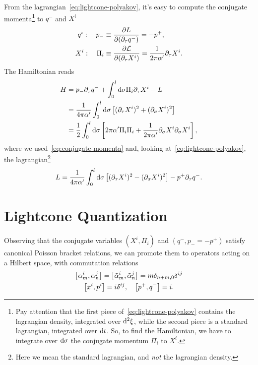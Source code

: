 From the lagrangian~\eqref{eq:lightcone-polyakov}, it's easy to compute the conjugate momenta\footnote{Pay attention that the first piece of~\eqref{eq:lightcone-polyakov} contains the lagrangian density, integrated over $\mathop{}\!\mathrm{d}^2 \xi$, while the second piece is a standard lagrangian, integrated over $\mathop{}\!\mathrm{d} t$. So, to find the Hamiltonian, we have to integrate over $\mathop{}\!\mathrm{d} \sigma$ the conjugate momentum $\Pi_i$ to $X^i$.} to $q^-$ and $X^i$
\begin{subequations}\label{eq:conjugate-momenta}
\begin{align}
    q^i: \quad p_- &\equiv \frac{\partial L}{\partial(\partial_\tau q^-)} = - p^+, \\
    X^i: \quad \Pi_i &\equiv \frac{\partial \mathcal{L}}{\partial(\partial_\tau X^i)} = \frac{1}{2\pi\alpha'} \partial_\tau X^i .
\end{align}
\end{subequations}
The Hamiltonian reads
\begin{equation}\label{eq:lightcone-hamiltonian}
\begin{split}
    H &= p_- \partial_\tau q^- + \int_0^l \mathop{}\!\mathrm{d} \sigma \Pi_i \partial_\tau X^i - L \\
    &= \frac{1}{4\pi\alpha'} \int_0^l \mathop{}\!\mathrm{d} \sigma \left[ (\partial_\tau X^i)^2 + (\partial_\sigma X^i)^2 \right] \\ 
    &= \frac{1}{2} \int_0^l \mathop{}\!\mathrm{d} \sigma \left[ 2\pi\alpha' \Pi_i \Pi_i + \frac{1}{2\pi\alpha'} \partial_\sigma X^i \partial_\sigma X^i \right],
\end{split}
\end{equation}
where we used~\eqref{eq:conjugate-momenta} and, looking at~\eqref{eq:lightcone-polyakov}, the lagrangian\footnote{Here we mean the standard lagrangian, and \emph{not} the lagrangian density.}
\begin{equation}
    L = \frac{1}{4\pi\alpha'} \int_0^l \mathop{}\!\mathrm{d} \sigma \left[ (\partial_\tau X^i)^2 - (\partial_\sigma X^i)^2 \right] - p^+ \partial_\tau q^- .
\end{equation}


\section{Lightcone Quantization}\label{sec:bosonic-quant}
Observing that the conjugate variables $(X^i, \Pi_i)$ and $(q^-,p_- = - p^+)$ satisfy canonical Poisson bracket relations, we can promote them to operators acting on a Hilbert space, with commutation relations
\begin{gather}
    \comm{\alpha^i_m}{\alpha^j_n} = \comm{\tilde{\alpha}^i_m}{\tilde{\alpha}^j_n} = m \delta_{n+m,0} \delta^{ij} \\
    \comm{x^i}{p^i} = i \delta^{ij}, \quad \comm{p^+}{q^-} = i .
\end{gather}

